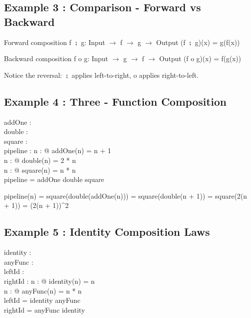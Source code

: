 \documentclass[a4paper,10pt,fleqn]{article}
\begin{document}
\bigskip

\subsection*{Example 3 : Comparison - Forward vs Backward}

\noindent Forward composition f $\semi$ g: Input $\rightarrow$ f $\rightarrow$ g $\rightarrow$ Output (f $\semi$ g)(x) = g(f(x))

\bigskip

\noindent Backward composition f o g: Input $\rightarrow$ g $\rightarrow$ f $\rightarrow$ Output (f o g)(x) = f(g(x))

\bigskip

\noindent Notice the reversal: $\semi$ applies left-to-right, o applies right-to-left.

\bigskip

\subsection*{Example 4 : Three - Function Composition}

\begin{axdef}
addOne : \nat \fun \nat \\
double : \nat \fun \nat \\
square : \nat \fun \nat \\
pipeline : \nat \fun \nat
\where
\forall n : \nat @ addOne(n) = n + 1 \\
\forall n : \nat @ double(n) = 2 * n \\
\forall n : \nat @ square(n) = n * n \\
pipeline = addOne \comp double \comp square
\end{axdef}

\noindent pipeline(n) = square(double(addOne(n))) = square(double(n + 1)) = square(2(n + 1)) = (2(n + 1))\textasciicircum{}2

\bigskip

\subsection*{Example 5 : Identity Composition Laws}

\begin{axdef}
identity : \nat \fun \nat \\
anyFunc : \nat \fun \nat \\
leftId : \nat \fun \nat \\
rightId : \nat \fun \nat
\where
\forall n : \nat @ identity(n) = n \\
\forall n : \nat @ anyFunc(n) = n * n \\
leftId = identity \comp anyFunc \\
rightId = anyFunc \comp identity
\end{axdef}
\end{document}
